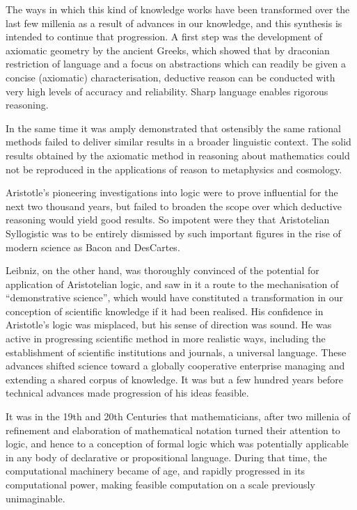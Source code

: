 \documentclass[10pt,titlepage]{book}
\begin{document}
The ways in which this kind of knowledge works have been transformed over the last few millenia as a result of advances in our knowledge, and this synthesis is intended to continue that progression.
A first step was the development of axiomatic geometry by the ancient Greeks, which showed that by draconian restriction of language and a focus on abstractions which can readily be given a concise (axiomatic) characterisation, deductive reason can be conducted with very high levels of accuracy and reliability.
Sharp language enables rigorous reasoning.

In the same time it was amply demonstrated that ostensibly the same rational methods failed to deliver similar results in a broader linguistic context.
The solid results obtained by the axiomatic method in reasoning about mathematics could not be reproduced in the applications of reason to metaphysics and cosmology.

Aristotle's pioneering investigations into logic were to prove influential for the next two thousand years, but failed to broaden the scope over which deductive reasoning would yield good results.
So impotent were they that Aristotelian Syllogistic was to be entirely dismissed by such important figures in the rise of modern science as Bacon and DesCartes.

Leibniz, on the other hand, was thoroughly convinced of the potential for application of Aristotelian logic, and saw in it a route to the mechanisation of ``demonstrative science'', which would have constituted a transformation in our conception of scientific knowledge if it had been realised.
His confidence in Aristotle's logic was misplaced, but his sense of direction was sound.
He was active in progressing scientific method in more realistic ways, including the establishment of scientific institutions and journals, a universal language.
These advances shifted science toward a globally cooperative enterprise managing and extending a shared corpus of knowledge.
It was but a few hundred years before technical advances made progression of his ideas feasible.

It was in the 19th and 20th Centuries that mathematicians, after two millenia of refinement and elaboration of mathematical notation turned their attention to logic, and hence to a conception of formal logic which was potentially applicable in any body of declarative or propositional language.
During that time, the computational machinery became of age, and rapidly progressed in its computational power, making feasible computation on a scale previously unimaginable.
\end{document}

